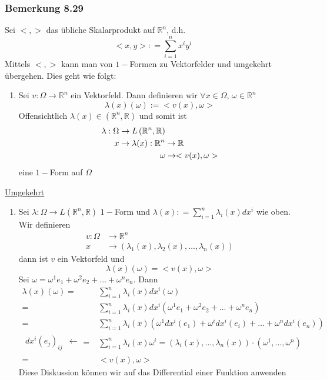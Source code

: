 \subsubsection*{Bemerkung 8.29}
Sei $<,>$ das übliche Skalarprodukt auf $\mathbb{R}^n$, d.h. \[ < x,y > : = \sum\limits_{i = 1}^n {{x^i}{y^i}} \]
Mittels $<,>$ kann man von $1-$Formen zu Vektorfelder und umgekehrt übergehen. Dies geht wie folgt:
\begin{enumerate}
\item Sei $v:\Omega\rightarrow\mathbb{R}^n$ ein Vektorfeld. Dann definieren wir $\forall x\in\Omega$, $\omega\in\mathbb{R}^n$
$$\lambda (x)(\omega):= < v(x),\omega >$$ Offensichtlich $\lambda (x)\in\left( \mathbb{R}^n, \mathbb{R}\right)$ und somit ist 
\begin{align*}
\lambda : \Omega &\rightarrow L\left(\mathbb{R}^n, \mathbb{R}\right) \\
x &\rightarrow\lambda (x): \mathbb{R}^n \rightarrow\mathbb{R}\\
&\hspace{17.5mm}\omega \rightarrow <v(x),\omega >
\end{align*}
eine $1-$Form auf $\Omega$
\end{enumerate}
\underline{Umgekehrt}
\begin{enumerate}[\indent 2.]
\item Sei $\lambda :\Omega\rightarrow L\left(\mathbb{R}^n,\mathbb{R}\right)$ $1-$Form und $\lambda (x): = \sum\limits_{i = 1}^n {{\lambda _i}(x)d{x^i}} $ wie oben.\\

Wir definieren 
\begin{align*}
v:\Omega &\rightarrow\mathbb{R}^n\\
x &\rightarrow \left( \lambda _1(x),\lambda _2(x),\dots,\lambda _n(x) \right)
\end{align*}
dann ist $v$ ein Vektorfeld und $$\lambda (x)(\omega)= < v(x),\omega>$$ Sei $\omega = \omega^1e_1+\omega^2 e_2 + \dots + \omega^n e_n$. Dann
\begin{align*}
\lambda (x)(\omega ) = & \sum\limits_{i = 1}^n {{\lambda _i}(x)d{x^i}(\omega )}\\
= & \sum\limits_{i = 1}^n {{\lambda _i}(x)d{x^i}\left( {{\omega ^1}{e_1} + {\omega ^2}{e_2} +  \ldots  + {\omega ^n}{e_n}} \right)}\\
 = & \sum\limits_{i = 1}^n {{\lambda _i}(x)\left( {{\omega ^1}d{x^i}\left( {{e_1}} \right) + {\omega ^i}d{x^i}\left( {{e_i}} \right) +  \ldots  + {\omega ^n}d{x^i}\left( {{e_n}} \right)} \right)} \\
\begin{array}{*{20}{c}}
{d{x^i}{{\left( {{e_j}} \right)}_{ij}}}& \leftarrow 
\end{array} = & \sum\limits_{i = 1}^n {{\lambda _i}(x){\omega ^i}}  = \left( {{\lambda _i}(x), \ldots ,{\lambda _n}(x)} \right) \cdot \left( {{\omega ^1}, \ldots ,{\omega ^n}} \right)\\
 = & < v(x),\omega  > 
\end{align*}
Diese Diskussion können wir auf das Differential einer Funktion anwenden
\end{enumerate}


